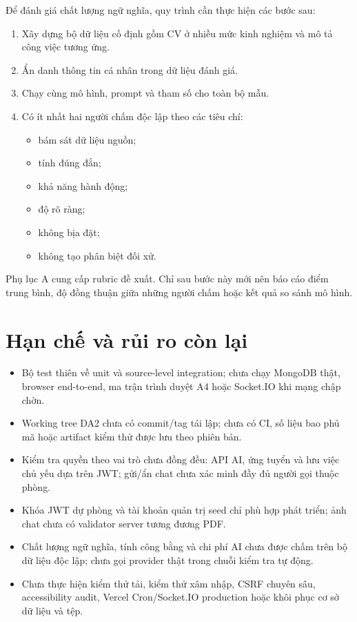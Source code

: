 Để đánh giá chất lượng ngữ nghĩa, quy trình cần thực hiện các bước sau:

\begin{enumerate}
    \item Xây dựng bộ dữ liệu cố định gồm CV ở nhiều mức kinh nghiệm và mô tả công việc tương ứng.
    \item Ẩn danh thông tin cá nhân trong dữ liệu đánh giá.
    \item Chạy cùng mô hình, prompt và tham số cho toàn bộ mẫu.
    \item Có ít nhất hai người chấm độc lập theo các tiêu chí:
    \begin{itemize}
        \item bám sát dữ liệu nguồn;
        \item tính đúng đắn;
        \item khả năng hành động;
        \item độ rõ ràng;
        \item không bịa đặt;
        \item không tạo phân biệt đối xử.
    \end{itemize}
\end{enumerate}

Phụ lục A cung cấp rubric đề xuất. Chỉ sau bước này mới nên báo cáo điểm trung bình, độ đồng thuận giữa những người chấm hoặc kết quả so sánh mô hình.

\section{Hạn chế và rủi ro còn lại}

\begin{itemize}
    \item Bộ test thiên về unit và source-level integration; chưa chạy MongoDB thật, browser end-to-end, ma trận trình duyệt A4 hoặc Socket.IO khi mạng chập chờn.
    \item Working tree DA2 chưa có commit/tag tái lập; chưa có CI, số liệu bao phủ mã hoặc artifact kiểm thử được lưu theo phiên bản.
    \item Kiểm tra quyền theo vai trò chưa đồng đều: API AI, ứng tuyển và lưu việc chủ yếu dựa trên JWT; gửi/ẩn chat chưa xác minh đầy đủ người gọi thuộc phòng.
    \item Khóa JWT dự phòng và tài khoản quản trị seed chỉ phù hợp phát triển; ảnh chat chưa có validator server tương đương PDF.
    \item Chất lượng ngữ nghĩa, tính công bằng và chi phí AI chưa được chấm trên bộ dữ liệu độc lập; chưa gọi provider thật trong chuỗi kiểm tra tự động.
    \item Chưa thực hiện kiểm thử tải, kiểm thử xâm nhập, CSRF chuyên sâu, accessibility audit, Vercel Cron/Socket.IO production hoặc khôi phục cơ sở dữ liệu và tệp.
\end{itemize}

